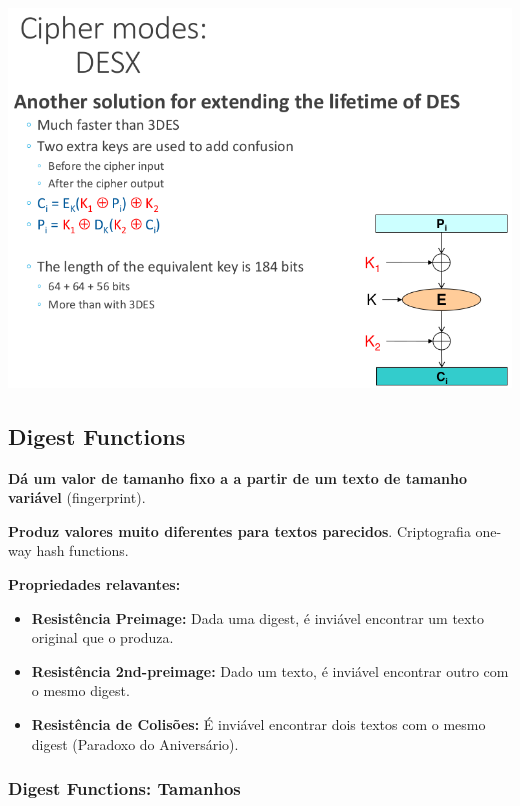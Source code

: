 \documentclass{article}
\begin{document}
\begin{center}
  \includegraphics[scale=0.3]{93}
\end{center}

\subsection{Digest Functions}

\begin{flushleft}
  \textbf{Dá um valor de tamanho fixo a a partir de um texto de tamanho variável} (fingerprint).

  \vspace{2mm}

  \textbf{Produz valores muito diferentes para textos parecidos}. Criptografia
  one-way hash functions.

  \vspace{2mm}

  \textbf{Propriedades relavantes:}
  \begin{itemize}
    \item \textbf{Resistência Preimage:} Dada uma digest, é inviável encontrar um texto original que o produza.
    \item \textbf{Resistência 2nd-preimage:} Dado um texto, é inviável encontrar
    outro com o mesmo digest.
    \item \textbf{Resistência de Colisões:} É inviável encontrar dois textos
    com o mesmo digest (Paradoxo do Aniversário).
  \end{itemize}
\end{flushleft}

\subsubsection{Digest Functions: Tamanhos}
\end{document}
